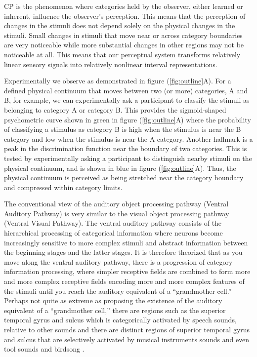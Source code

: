 \acf{CP} is the phenomenon where categories held by the observer, either learned or inherent, influence the observer's perception. This means that the perception of changes in the stimuli does not depend solely on the physical changes in the stimuli. Small changes in stimuli that move near or across category boundaries are very noticeable while more substantial changes in other regions may not be noticeable at all. This means that our perceptual system transforms relatively linear sensory signals into relatively nonlinear interval representations.

Experimentally we observe \CP as demonstrated in figure (\ref{fig:outline}A). For a defined physical continuum that moves between two (or more) categories, A and B, for example, we can experimentally ask a participant to classify the stimuli as belonging to category A or category B. This provides the sigmoid-shaped psychometric curve shown in green in figure (\ref{fig:outline}A) where the probability of classifying a stimulus as category B is high when the stimulus is near the B category and low when the stimulus is near the A category. Another \CP hallmark is a peak in the discrimination function near the boundary of two categories. This is tested by experimentally asking a participant to distinguish nearby stimuli on the physical continuum, and is shown in blue in figure (\ref{fig:outline}A). Thus, the physical continuum is perceived as being stretched near the category boundary and compressed within category limits.

The conventional view of the auditory object processing pathway (Ventral Auditory Pathway) is very similar to the visual object processing pathway (Ventral Visual Pathway). The ventral auditory pathway consists of the hierarchical processing of categorical information where neurons become increasingly sensitive to more complex stimuli and abstract information between the beginning stages and the latter stages. It is therefore theorized that as you move along the ventral auditory pathway, there is a progression of category information processing, where simpler receptive fields are combined to form more and more complex receptive fields encoding more and more complex features of the stimuli until you reach the auditory equivalent of a ``grandmother cell.'' Perhaps not quite as extreme as proposing the existence of the auditory equivalent of a ``grandmother cell,'' there are regions such as the superior temporal gyrus and sulcus which is categorically activated by speech sounds, relative to other sounds \cite{Binder2000, leaver2010cortical} and there are distinct regions of superior temporal gyrus and sulcus that are selectively activated by musical instruments sounds \cite{leaver2010cortical} and even tool sounds and birdsong \cite{doehrmann2008probing}.

